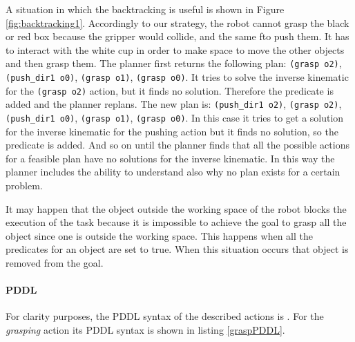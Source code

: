 A situation in which the backtracking is useful is shown in Figure \ref{fig:backtracking1}. Accordingly to our strategy, the robot cannot grasp the black or red box because the gripper would collide, and the same fto push them. It has to interact with the white cup in order to make space to move the other objects and then grasp them. The planner first returns the following plan: \texttt{(grasp o2)}, \texttt{(push\_dir1 o0)}, \texttt{(grasp o1)}, \texttt{(grasp o0)}. It tries to solve the inverse kinematic for the \texttt{(grasp o2)} action, but it finds no solution. Therefore the predicate  is added and the planner replans. The new plan is: \texttt{(push\_dir1 o2)}, \texttt{(grasp o2)}, \texttt{(push\_dir1 o0)}, \texttt{(grasp o1)}, \texttt{(grasp o0)}. In this case it tries to get a solution for the inverse kinematic for the pushing action but it finds no solution, so the predicate  is added. And so on until the planner finds that all the possible actions for a feasible plan have no solutions for the inverse kinematic. In this way the planner includes the ability to understand also why no plan exists for a certain problem. 

It may happen that the object outside the working space of the robot blocks the execution of the task because it is impossible to achieve the goal to grasp all the object since one is outside the working space.
This happens when all the  predicates for an object are set to true. When this situation occurs that object is removed from the goal. 

\paragraph{PDDL}
For clarity purposes, the PDDL syntax of the described actions is . 
For the \textit{grasping} action its PDDL syntax is shown in listing \ref{graspPDDL}.

